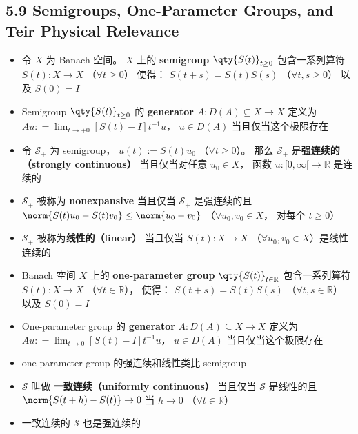 \subsection{5.9 Semigroups, One-Parameter Groups, and Teir Physical Relevance}
\begin{itemize}
\item 令 $X$ 为 Banach 空间。 $X$ 上的 \textbf{semigroup} $\qty{S(t)}_{t\ge0}$ 包含一系列算符 $S(t):X\to X$ （$\forall t\ge0$） 使得： $S(t+s) = S(t)S(s)$ （$\forall t, s\ge 0$） 以及 $S(0) = I$

\item Semigroup $\qty{S(t)}_{t\ge0}$ 的 \textbf{generator} $A:D(A) \subseteq X\to X$ 定义为 $Au: = \lim_{t\to+0} [S(t)-I]t^{-1} u$， $u\in D(A)$ 当且仅当这个极限存在

\item 令 $\mathcal S_+$ 为 semigroup， $u(t) := S(t)u_0$ （$\forall t \ge 0$）。 那么 $\mathcal S_+$ 是\textbf{强连续的（strongly continuous）} 当且仅当对任意 $u_0\in X$， 函数 $u:[0,\infty[ \to\mathbb R$ 是连续的

\item $\mathcal S_+$ 被称为 \textbf{nonexpansive} 当且仅当 $\mathcal S_+$ 是强连续的且 $\norm{S(t)u_0 - S(t)v_0} \le \norm{u_0 - v_0}$ （$\forall u_0, v_0 \in X$， 对每个 $t\ge0$）

\item $\mathcal S_+$ 被称为\textbf{线性的（linear）} 当且仅当 $S(t): X\to X$ （$\forall u_0, v_0\in X$）是线性连续的

\item Banach 空间 $X$ 上的 \textbf{one-parameter group} $\qty{S(t)}_{t\in\mathbb R}$ 包含一系列算符 $S(t):X\to X$ （$\forall t\in\mathbb R$）， 使得： $S(t+s) = S(t)S(s)$ （$\forall t, s\in \mathbb R$） 以及 $S(0) = I$

\item One-parameter group 的 \textbf{generator} $A:D(A) \subseteq X\to X$ 定义为 $Au: = \lim_{t\to0} [S(t)-I]t^{-1} u$， $u\in D(A)$ 当且仅当这个极限存在

\item one-parameter group 的强连续和线性类比 semigroup

\item $\mathcal S$ 叫做 \textbf{一致连续（uniformly continuous）} 当且仅当 $\mathcal S$ 是线性的且 $\norm{S(t+h)-S(t)}\to0$ 当 $h\to0$ （$\forall t\in\mathbb R$）

\item 一致连续的 $\mathcal S$ 也是强连续的


\end{itemize}
